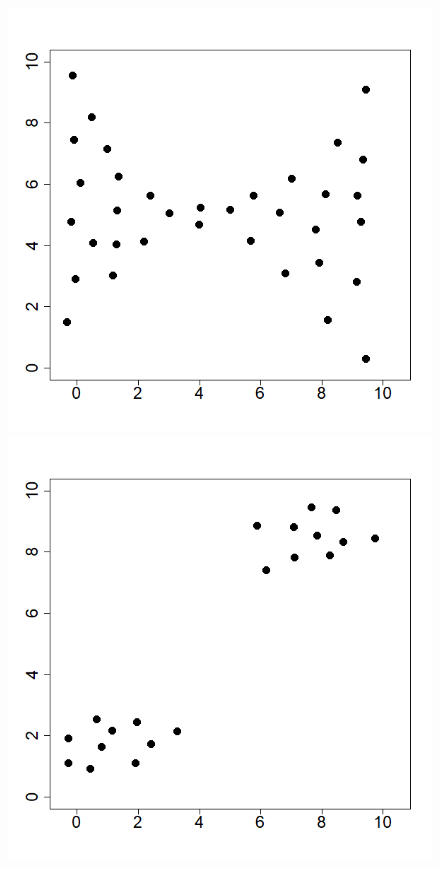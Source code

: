 \documentclass[captions=tableheading, 12pt, headings=small, parskip=half]{scrartcl}
\begin{document}
\begin{figure}[H]
\begin{minipage}{0.32 \columnwidth}
	\end{minipage}
	\hfill
	\begin{minipage}{0.32 \columnwidth}
		\includegraphics[width = \columnwidth]{Code1/plot3.png}
		\includegraphics[width = \columnwidth]{Code1/plot6.png}
	\end{minipage}
\end{figure}
\end{document}
